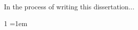 \documentclass[12pt,letterpaper]{uncdissertation}
\begin{document}


    \begin{acknowledgments}


In the process of writing this dissertation...


\end{acknowledgments}



\newpage
\begin{spacing}{1}
\begingroup
\renewcommand*{\addvspace}[1]{}
\emergencystretch=1em
\tableofcontents
\newpage
{}
\listoftables
\newpage
{}
\listoffigures
\endgroup
\end{spacing}
\end{document}
